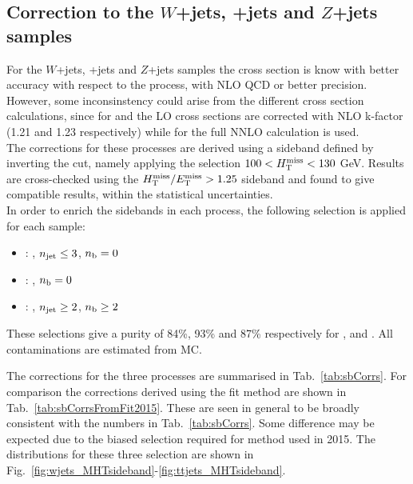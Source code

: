 \subsection{Correction to the $W$+jets, \ttbar+jets and $Z$+jets samples}
\label{sec:sideband_corrections_w_z_tt}
For the $W$+jets, \ttbar+jets and $Z$+jets samples the cross section is know with better accuracy with respect to the \gj process, 
with NLO QCD or better precision.
However, some inconsinstency could arise from the different cross section calculations, since for \wj and \zj the LO cross sections 
are corrected with NLO k-factor (1.21 and 1.23 respectively) while for \ttbar the full NNLO calculation is used. \\
The corrections for these processes are derived using a sideband defined by inverting the \mht cut, namely 
applying the selection $100 < \mht < 130$ GeV. 
Results are cross-checked using the $\mhtmet > 1.25$ sideband and found to give compatible results, within the statistical uncertainties. \\
In order to enrich the sidebands in each process, the following selection is applied for each sample:
\begin{itemize}
\item \wj: \mj, $\nj \leq 3$, $\nb = 0$
\item \zj: \mmj, $\nb = 0$
\item \ttj: \mj, $\nj \geq 2$, $\nb \geq 2$
\end{itemize}
These selections give a purity of 84\%, 93\% and 87\% respectively for \wj, \zj and \ttj. All contaminations are estimated from MC.

The corrections for the three processes are summarised in Tab.~\ref{tab:sbCorrs}.
For comparison the corrections derived using the fit method are shown in Tab.~\ref{tab:sbCorrsFromFit2015}. These are 
seen in general to be broadly consistent with the numbers in  Tab.~\ref{tab:sbCorrs}. Some difference
may be expected due to the biased selection required for method used in 2015.
The \mht distributions for these three selection are shown in Fig.~\ref{fig:wjets_MHTsideband}-\ref{fig:ttjets_MHTsideband}. \\

